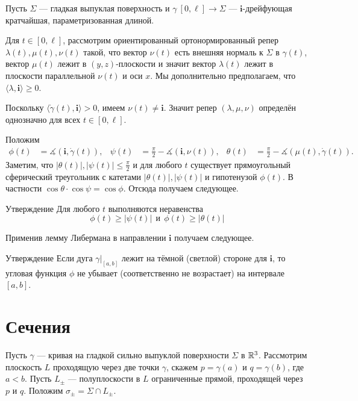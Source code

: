 \documentclass[a4paper,10pt]{article}
\begin{document}
Пусть $\Sigma$ --- гладкая выпуклая поверхность 
и $\gamma\:[0,\ell]\to \Sigma$ --- $\bm{i}$-дрейфующая кратчайшая, 
параметризованная длиной.

Для $t\in [0,\ell]$, 
рассмотрим ориентированный ортонормированный репер $\lambda(t),\mu(t),\nu(t)$ 
такой, что вектор $\nu(t)$ есть внешняя нормаль к $\Sigma$ в $\gamma(t)$,
вектор $\mu(t)$ лежит в $(y,z)$-плоскости 
и значит вектор $\lambda(t)$ лежит в плоскости параллельной $\nu(t)$ и оси $x$.
Мы дополнительно предполагаем, что $\langle\lambda,\bm{i}\rangle\ge 0$.

Поскольку $\langle\dot\gamma(t),\bm{i}\rangle>0$, имеем 
$\nu(t)\ne\bm{i}$. 
Значит репер $(\lambda,\mu,\nu)$ определён однозначно для всех $t\in[0,\ell]$.

Положим
\begin{align*}
\phi(t)&=\measuredangle(\bm{i},\dot\gamma(t)),&
\psi(t)&=\tfrac\pi2-\measuredangle(\bm{i},\nu(t)),&
\theta(t)&=\tfrac\pi2-\measuredangle(\mu(t),\dot\gamma(t)).
\end{align*}
Заметим, что $|\theta(t)|,|\psi(t)|\le \tfrac\pi2$ 
и для любого $t$ существует прямоугольный сферический треугольник с катетами $|\theta(t)|,|\psi(t)|$ и гипотенузой $\phi(t)$.
В частности $\cos\theta\cdot\cos\psi=\cos\phi$.
Отсюда получаем следующее.

\begin{thm}{Утверждение}\label{clm:alpha-phi-psi}
Для любого $t$ выполняются неравенства 
\[
\phi(t)\ge |\psi(t)|\ \ \text{и}\ \ \phi(t)\ge |\theta(t)|
\]

\end{thm}

Применив лемму Либермана в направлении $\bm{i}$ получаем следующее.

\begin{thm}{Утверждение}\label{clm:7.3}
Если дуга $\gamma|_{[a,b]}$ лежит на тёмной (светлой) стороне для $\bm{i}$, 
то угловая функция $\phi$ не убывает (соответственно не возрастает) на интервале $[a,b]$.
\end{thm}

\section{Сечения}

Пусть $\gamma$ --- кривая на гладкой сильно выпуклой поверхности $\Sigma$ в $\mathbb{R}^3$.
Рассмотрим плоскость $L$ 
проходящую через две точки $\gamma$, 
скажем $p=\gamma(a)$ и $q=\gamma(b)$, где $a<b$.
Пусть $L_\pm$ --- полуплоскости в $L$ ограниченные прямой, проходящей через $p$ и $q$.
Положим $\sigma_\pm=\Sigma\cap L_\pm$.
\end{document}
